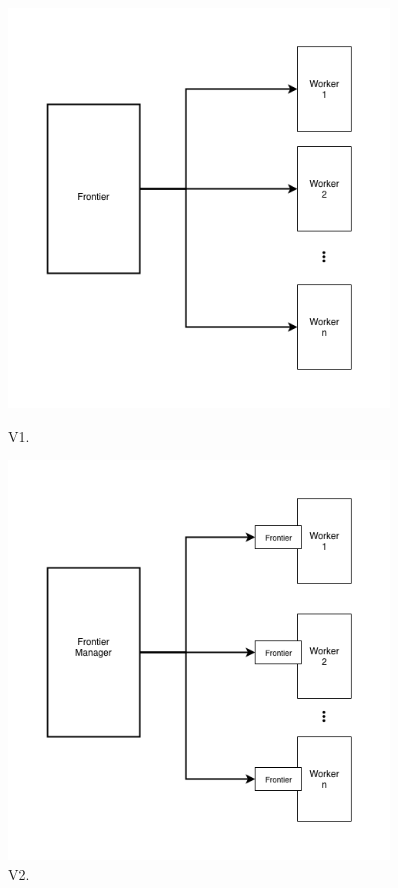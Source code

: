 \documentclass{article}
\begin{document}
\begin{figure}
	\begin{minipage}{0.45\textwidth}
		\centering
		\includegraphics[width=0.9\textwidth]{jittered-delay.png}
		\caption{V1.}
		\label{fig:1}
	\end{minipage}\hfill
	\begin{minipage}{0.45\textwidth}
		\centering
		\includegraphics[width=0.9\textwidth]{frontier-manager.png}
		\caption{V2.}
		\label{fig:2}
\end{minipage}
\end{figure}
\end{document}
